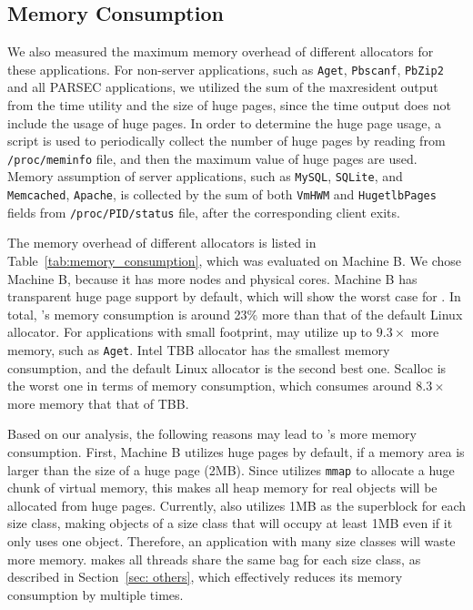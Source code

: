 \subsection{Memory Consumption}
\label{sec:memory}

We also measured the maximum memory overhead of different allocators for these applications. For non-server applications, such as \texttt{Aget}, \texttt{Pbscanf}, \texttt{PbZip2} and all PARSEC applications, we utilized the sum of the maxresident output from the time utility and the size of huge pages, since the time output does not include the usage of huge pages. In order to determine the huge page usage, a script is used to periodically collect the number of huge pages by reading from \texttt{/proc/meminfo} file, and then the maximum value of huge pages are used. Memory assumption of server applications, such as \texttt{MySQL}, \texttt{SQLite}, and \texttt{Memcached}, \texttt{Apache}, is collected by the sum of both \texttt{VmHWM} and \texttt{HugetlbPages} fields from \texttt{/proc/PID/status} file, after the corresponding client exits. 




The memory overhead of different allocators is listed in Table~\ref{tab:memory_consumption}, which was evaluated on Machine B. We chose Machine B, because it has more nodes and physical cores. Machine B has transparent huge page support by default, which will show the worst case for \NM{}. In total, \NM{}'s memory consumption is around 23\% more than that of the default Linux allocator. For applications with small footprint, \NM{} may utilize up to $9.3\times$ more memory, such as \texttt{Aget}. Intel TBB allocator has the smallest memory consumption, and the default Linux allocator is the second best one. Scalloc is the worst one in terms of memory consumption, which consumes around  $8.3\times$ more memory that that of TBB.  
 
 Based on our analysis, the following reasons may lead to \NM{}'s more memory consumption. First, Machine B utilizes huge pages by default, if a memory area is larger than the size of a huge page (2MB). Since \NM{} utilizes \texttt{mmap} to allocate a huge chunk of virtual memory, this makes all heap memory for real objects will be allocated from huge pages. Currently, \NM{} also utilizes 1MB as the superblock for each size class, making objects of a size class that will occupy at least 1MB even if it only uses one object. Therefore, an application with many size classes will waste more memory.  \NM{} makes all threads share the same bag for each size class, as described in Section~\ref{sec: others}, which effectively reduces its memory consumption by multiple times. 
 
